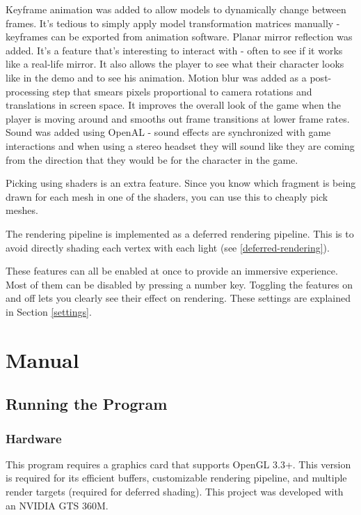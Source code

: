 \documentclass{book}
\begin{document}
    Keyframe animation was added to allow models to dynamically change between frames. It's tedious to simply apply model transformation matrices manually - keyframes can be exported from animation software.
    Planar mirror reflection was added. It's a feature that's interesting to interact with - often to see if it works like a real-life mirror. It also allows the player to see what their character looks like in the demo and to see his animation.
    Motion blur was added as a post-processing step that smears pixels proportional to camera rotations and translations in screen space. It improves the overall look of the game when the player is moving around and smooths out frame transitions at lower frame rates.
    Sound was added using OpenAL - sound effects are synchronized with game interactions and when using a stereo headset they will sound like they are coming from the direction that they would be for the character in the game.

    Picking using shaders is an extra feature. Since you know which fragment is being drawn for each mesh in one of the shaders, you can use this to cheaply pick meshes.

    The rendering pipeline is implemented as a deferred rendering pipeline. This is to avoid directly shading each vertex with each light (see \ref{deferred-rendering}).

    These features can all be enabled at once to provide an immersive experience. Most of them can be disabled by pressing a number key. Toggling the features on and off lets you clearly see their effect on rendering. These settings are explained in Section \ref{settings}.


\chapter{Manual}
  \section{Running the Program}
    \subsection{Hardware}
      This program requires a graphics card that supports OpenGL 3.3+.
      This version is required for its efficient buffers, customizable rendering pipeline, and multiple render targets (required for deferred shading).
      This project was developed with an NVIDIA GTS 360M.
\end{document}
